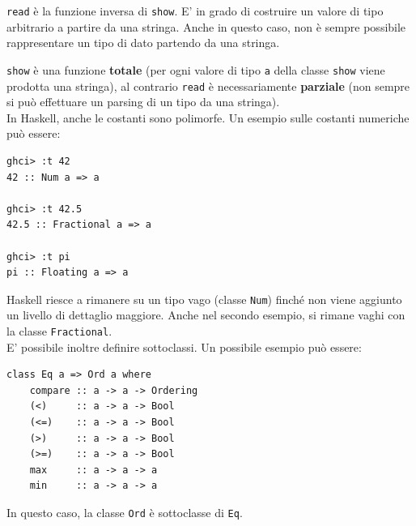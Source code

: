 \documentclass{article}
\begin{document}
\texttt{read} è la funzione inversa di \texttt{show}. E' in grado di costruire un valore di tipo arbitrario a partire da una stringa. Anche in questo caso, non è sempre possibile rappresentare un tipo di dato partendo da una stringa.

\texttt{show} è una funzione \textbf{totale} (per ogni valore di tipo \texttt{a} della classe \texttt{show} viene prodotta una stringa), al contrario \texttt{read} è necessariamente \textbf{parziale} (non sempre si può effettuare un parsing di un tipo da una stringa).\vspace{14pt}\\
In Haskell, anche le costanti sono polimorfe. Un esempio sulle costanti numeriche può essere:
\begin{tcolorbox}
\begin{verbatim}
ghci> :t 42
42 :: Num a => a

ghci> :t 42.5
42.5 :: Fractional a => a

ghci> :t pi
pi :: Floating a => a
\end{verbatim}
\end{tcolorbox}
Haskell riesce a rimanere su un tipo vago (classe \texttt{Num}) finché non viene aggiunto un livello di dettaglio maggiore. Anche nel secondo esempio, si rimane vaghi con la classe \texttt{Fractional}.\vspace{14pt}\\
E' possibile inoltre definire sottoclassi. Un possibile esempio può essere:
\begin{tcolorbox}
\begin{verbatim}
class Eq a => Ord a where
    compare :: a -> a -> Ordering
    (<)     :: a -> a -> Bool
    (<=)    :: a -> a -> Bool
    (>)     :: a -> a -> Bool
    (>=)    :: a -> a -> Bool
    max     :: a -> a -> a
    min     :: a -> a -> a
\end{verbatim}
\end{tcolorbox}
In questo caso, la classe \texttt{Ord} è sottoclasse di \texttt{Eq}.

\pagebreak
\end{document}
